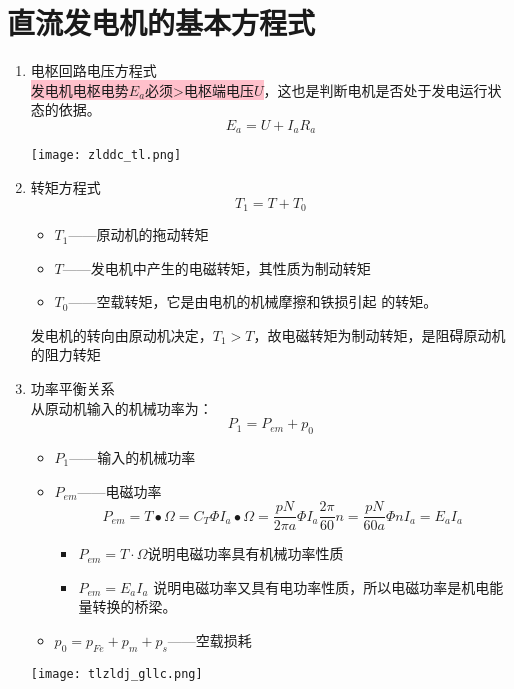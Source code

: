 \documentclass[blue]{elegantnote}
\begin{document}
\section{直流发电机的基本方程式}
\begin{enumerate}
	\item 电枢回路电压方程式  \\         
	\colorbox{pink}{发电机电枢电势$E_{a}$必须>电枢端电压$U$}，这也是判断电机是否处于发电运行状态的依据。 
	$${E_a} = U + {I_a}{R_a}$$
	\begin{center}
		\texttt{[image: zlddc\_tl.png]}
	\end{center}
	\item 转矩方程式
	$${T_1} = T + {T_0}$$
	\begin{itemize}
		\item $T_{1}$——原动机的拖动转矩
		\item $T$——发电机中产生的电磁转矩，其性质为制动转矩
		\item $T_{0}$——空载转矩，它是由电机的机械摩擦和铁损引起
		的转矩。
	\end{itemize}
	发电机的转向由原动机决定，$T_{1}>T$，故电磁转矩为制动转矩，是阻碍原动机的阻力转矩
	\item 功率平衡关系\\
	从原动机输入的机械功率为：
	$${P_1} = {P_{em}} + {p_0}$$
	\begin{itemize}
		\item $P_{1}$——输入的机械功率
		\item $P_{em}$——电磁功率
		\[{P_{em}} = T \bullet \Omega  = {C_T}\Phi {I_a} \bullet \Omega  = \frac{{pN}}{{2\pi a}}\Phi {I_a}\frac{{2\pi }}{{60}}n = \frac{{pN}}{{60a}}\Phi n{I_a} = {E_a}{I_a}\]
		\begin{itemize}
			\item ${P_{em}} = T \cdot \Omega$说明电磁功率具有机械功率性质
			\item ${P_{em}} = {E_a}{I_a}$ 说明电磁功率又具有电功率性质，所以电磁功率是机电能量转换的桥梁。
		\end{itemize}
		\item $p_{0}=p_{Fe}+p_{m}+p_{s} $——空载损耗     
	\end{itemize}
		\begin{center}
			\texttt{[image: tlzldj\_gllc.png]}
		\end{center}
\end{enumerate}
\end{document}
